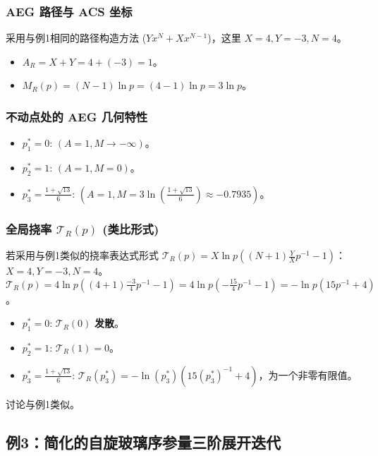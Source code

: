 \documentclass[12pt]{article}
\begin{document}
\subsubsection{AEG 路径与 ACS 坐标}
采用与例1相同的路径构造方法 ($Yx^N + Xx^{N-1}$)，这里 $X=4, Y=-3, N=4$。
\begin{itemize}
    \item $A_R = X+Y = 4 + (-3) = 1$。
    \item $M_R(p) = (N-1)\ln p = (4-1)\ln p = 3\ln p$。
\end{itemize}

\subsubsection{不动点处的 AEG 几何特性}
\begin{itemize}
    \item $p_1^* = 0$: $(A=1, M \rightarrow -\infty)$。
    \item $p_2^* = 1$: $(A=1, M = 0)$。
    \item $p_3^* = \frac{1 + \sqrt{13}}{6}$: $(A=1, M = 3\ln\left(\frac{1 + \sqrt{13}}{6}\right) \approx -0.7935)$。
\end{itemize}

\subsubsection{全局挠率 $\mathcal{T}_R(p)$ (类比形式)}
若采用与例1类似的挠率表达式形式 $\mathcal{T}_R(p) = X \ln p \left( (N+1) \frac{Y}{X} p^{-1} - 1 \right)$：
$X=4, Y=-3, N=4$。
$\mathcal{T}_R(p) = 4 \ln p \left( (4+1) \frac{-3}{4} p^{-1} - 1 \right) = 4 \ln p \left( -\frac{15}{4} p^{-1} - 1 \right) = -\ln p (15 p^{-1} + 4)$。
\begin{itemize}
    \item $p_1^* = 0$: $\mathcal{T}_R(0)$ \textbf{发散}。
    \item $p_2^* = 1$: $\mathcal{T}_R(1) = 0$。
    \item $p_3^* = \frac{1 + \sqrt{13}}{6}$: $\mathcal{T}_R(p_3^*) = -\ln(p_3^*) (15 (p_3^*)^{-1} + 4)$，为一个非零有限值。
\end{itemize}
讨论与例1类似。

\subsection{例3：简化的自旋玻璃序参量三阶展开迭代}
\end{document}
